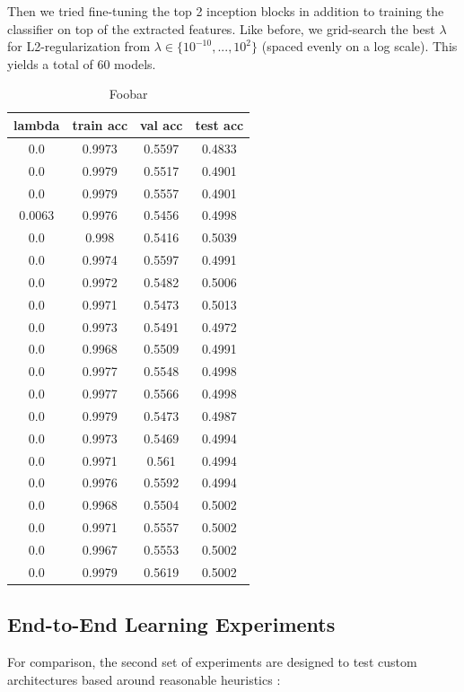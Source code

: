Then we tried fine-tuning the top 2 inception blocks in addition to training the classifier on top of the extracted features. Like before, we grid-search the best $\lambda$ for L2-regularization from $\lambda \in \{10^{-10}, ..., 10^{2}\}$ (spaced evenly on a log scale). This yields a total of $60$ models.

\begin{table}[ht]
\centering \begin{tabular}{ |c|c|c|c| }
\hline
lambda & train acc & val acc & test acc \\
\hline
0.0 & 0.9973 & 0.5597 & 0.4833 \\
0.0 & 0.9979 & 0.5517 & 0.4901 \\
0.0 & 0.9979 & 0.5557 & 0.4901 \\
0.0063 & 0.9976 & 0.5456 & 0.4998 \\
0.0 & 0.998 & 0.5416 & 0.5039 \\
0.0 & 0.9974 & 0.5597 & 0.4991 \\
0.0 & 0.9972 & 0.5482 & 0.5006 \\
0.0 & 0.9971 & 0.5473 & 0.5013 \\
0.0 & 0.9973 & 0.5491 & 0.4972 \\
0.0 & 0.9968 & 0.5509 & 0.4991 \\
0.0 & 0.9977 & 0.5548 & 0.4998 \\
0.0 & 0.9977 & 0.5566 & 0.4998 \\
0.0 & 0.9979 & 0.5473 & 0.4987 \\
0.0 & 0.9973 & 0.5469 & 0.4994 \\
0.0 & 0.9971 & 0.561 & 0.4994 \\
0.0 & 0.9976 & 0.5592 & 0.4994 \\
0.0 & 0.9968 & 0.5504 & 0.5002 \\
0.0 & 0.9971 & 0.5557 & 0.5002 \\
0.0 & 0.9967 & 0.5553 & 0.5002 \\
0.0 & 0.9979 & 0.5619 & 0.5002 \\
\hline
\end{tabular}
\caption{Foobar}
\label{table:foobar}
\end{table}

\subsection{End-to-End Learning Experiments}

For comparison, the second set of experiments are designed to test custom architectures based around reasonable heuristics \cite{cs231n}:

